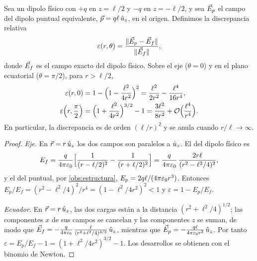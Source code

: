 

\begin{proposicion}\label{prop:discrepancia}
Sea un dipolo físico con $+q$ en $z=\ell/2$ y $-q$ en $z=-\ell/2$, y sea $\vec{E}_{p}$ el campo del dipolo puntual equivalente, $\vec{p}=q\ell\,\hat{u}_{z}$, en el
origen. Definimos la discrepancia relativa
\[
  \varepsilon(r,\theta)=\frac{\lVert \vec{E}_{p}-\vec{E}_{f}\rVert}{\lVert \vec{E}_{f}\rVert},
\]
donde $\vec{E}_{f}$ es el campo exacto del dipolo físico. Sobre el eje ($\theta=0$) y en el plano ecuatorial ($\theta=\pi/2$), para $r>\ell/2$,
\begin{equation}\label{eq:discrepancia}
\begin{aligned}
  \varepsilon(r,0)&=1-\Bigl(1-\frac{\ell^{2}}{4r^{2}}\Bigr)^{2}=\frac{\ell^{2}}{2r^{2}}-\frac{\ell^{4}}{16r^{4}},\\
  \varepsilon\Bigl(r,\frac{\pi}{2}\Bigr)&=\Bigl(1+\frac{\ell^{2}}{4r^{2}}\Bigr)^{3/2}-1=\frac{3\ell^{2}}{8r^{2}}+\mathcal{O}\Bigl(\frac{\ell^{4}}{r^{4}}\Bigr).
\end{aligned}
\end{equation}
En particular, la discrepancia es de orden $(\ell/r)^{2}$ y se anula cuando $r/\ell\to\infty$.
\end{proposicion}
\begin{proof}
\emph{Eje.} En $\vec{r}=r\,\hat{u}_{z}$ los dos campos son paralelos a $\hat{u}_{z}$. El del dipolo físico es
\[
  E_{f}=\frac{q}{4\pi\varepsilon_{0}}\Bigl[\frac{1}{(r-\ell/2)^{2}}-\frac{1}{(r+\ell/2)^{2}}\Bigr]=\frac{q}{4\pi\varepsilon_{0}}\,\frac{2r\ell}{(r^{2}-\ell^{2}/4)^{2}},
\]
y el del puntual, por \cref{obs:estructura}, $E_{p}=2q\ell/(4\pi\varepsilon_{0} r^{3})$. Entonces $E_{p}/E_{f}=(r^{2}-\ell^{2}/4)^{2}/r^{4}=(1-\ell^{2}/4r^{2})^{2}<1$ y
$\varepsilon=1-E_{p}/E_{f}$.

\emph{Ecuador.} En $\vec{r}=r\,\hat{u}_{x}$, las dos cargas están a la distancia $(r^{2}+\ell^{2}/4)^{1/2}$; las componentes $x$ de sus campos se cancelan y
las componentes $z$ se suman, de modo que $\vec{E}_{f}=-\frac{q}{4\pi\varepsilon_{0}}\,\frac{\ell}{(r^{2}+\ell^{2}/4)^{3/2}}\,\hat{u}_{z}$, mientras que
$\vec{E}_{p}=-\frac{q\ell}{4\pi\varepsilon_{0} r^{3}}\,\hat{u}_{z}$. Por tanto $\varepsilon=E_{p}/E_{f}-1=(1+\ell^{2}/4r^{2})^{3/2}-1$. Los desarrollos se obtienen con el binomio
de Newton.
\end{proof}



